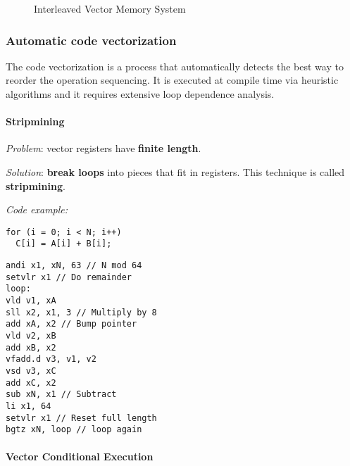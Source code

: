 \documentclass[english]{article}
\begin{document}
\begin{figure}[htbp]
  \bigskip
  \centering
  \caption{Interleaved Vector Memory System}
  \label{fig:interleaved-vector-memory-system}
  \bigskip
\end{figure}

\subsubsection{Automatic code vectorization}

The code vectorization is a process that automatically detects the best way to reorder the operation sequencing.
It is executed at compile time via heuristic algorithms and it requires extensive loop dependence analysis.

\paragraph{Stripmining}

\textit{Problem}: vector registers have \textbf{finite length}.

\textit{Solution}: \textbf{break loops} into pieces that fit in registers.
This technique is called \textbf{stripmining}.

\bigskip
\textit{Code example:}
\bigskip

\begin{minipage}{\textwidth}
  \begin{minipage}[t]{0.33\textwidth}
    \begin{verbatim}
for (i = 0; i < N; i++)
  C[i] = A[i] + B[i];
  \end{verbatim}
  \end{minipage}
  \begin{minipage}[t]{0.33\textwidth}
    \begin{verbatim}
andi x1, xN, 63 // N mod 64
setvlr x1 // Do remainder
loop:
vld v1, xA
sll x2, x1, 3 // Multiply by 8
add xA, x2 // Bump pointer
vld v2, xB
add xB, x2
vfadd.d v3, v1, v2
vsd v3, xC
add xC, x2
sub xN, x1 // Subtract
li x1, 64
setvlr x1 // Reset full length
bgtz xN, loop // loop again
  \end{verbatim}
  \end{minipage}
  \begin{minipage}[t]{0.33\textwidth}
    \centering
  \end{minipage}
\end{minipage}

\paragraph{Vector Conditional Execution}
\label{par:vector-conditional-execution}
\end{document}
